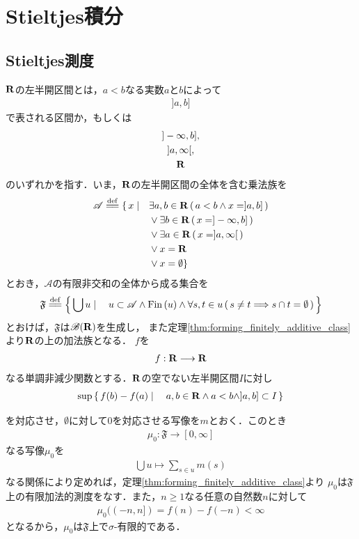\section{Stieltjes積分}
\subsection{Stieltjes測度}
	$\mathbf{R}$の左半開区間とは，$a < b$なる実数$a$と$b$によって
	\begin{align}
		]a,b]
	\end{align}
	で表される区間か，もしくは
	\begin{align}
		\begin{gathered}
			]-\infty,b],\\ 
			]a,\infty[,\\ 
			\mathbf{R}
		\end{gathered}
	\end{align}
	のいずれかを指す．いま，$\mathbf{R}$の左半開区間の全体を含む乗法族を
	\begin{align}
		\mathscr{A} \defeq \{\, x \mid \quad &\exists a,b \in \R\, (\, a < b \wedge x=]a,b] \, ) \\
		&\vee \exists b \in \R\, (\, x = ]-\infty,b]\, ) \\
		&\vee \exists a \in \R\, (\, x = ]a,\infty[\, ) \\
		&\vee x = \R\, \\
		&\vee x = \emptyset \}
	\end{align}
	とおき，$\mathscr{A}$の有限非交和の全体から成る集合を
	\begin{align}
		\mathfrak{F} \defeq \Set{\bigcup u}{u \subset \mathscr{A} \wedge \Fin{u} 
		\wedge \forall s,t \in u\, (\, s \neq t \Longrightarrow s \cap t = \emptyset\, )}
	\end{align}
	とおけば，$\mathfrak{F}$は$\mathscr{B}(\mathbf{R})$を生成し，
	また定理\ref{thm:forming_finitely_additive_class}より$\mathbf{R}$の上の加法族となる．
	$f$を
	\begin{align}
		f:\mathbf{R} \longrightarrow \mathbf{R}
	\end{align}
	なる単調非減少関数とする．$\mathbf{R}$の空でない左半開区間$I$に対し
	\begin{align}
		\operatorname*{sup}_{} \left\{\, f(b) - f(a) \mid \quad a,b \in \mathbf{R} \wedge a < b \wedge ]a,b] \subset I\, \right\}
	\end{align}
	を対応させ，$\emptyset$に対して$0$を対応させる写像を$m$とおく．このとき
	\begin{align}
		\mu_0:\mathfrak{F} \longrightarrow [0,\infty]
	\end{align}
	なる写像$\mu_0$を
	\begin{align}
		\bigcup u \longmapsto \sum_{s \in u}m(s)
	\end{align}
	なる関係により定めれば，定理\ref{thm:forming_finitely_additive_class}より
	$\mu_0$は$\mathfrak{F}$上の有限加法的測度をなす．また，$n \geq 1$なる任意の自然数$n$に対して
	\begin{align}
		\mu_0((-n,n]) = f(n) - f(-n) < \infty
	\end{align}
	となるから，$\mu_0$は$\mathfrak{F}$上で$\sigma$-有限的である．
	
